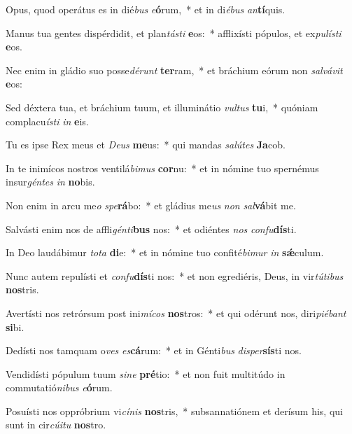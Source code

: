 \item Opus, quod operátus es in dié\textit{bus} \textit{e}\textbf{ó}rum,~* et in di\textit{é}\textit{bus} \textit{an}\textbf{tí}quis.
\item Manus tua gentes dispérdidit, et plan\textit{tás}\textit{ti} \textbf{e}os:~* afflixísti pópulos, et ex\textit{pu}\textit{lís}\textit{ti} \textbf{e}os.
\item Nec enim in gládio suo posse\textit{dé}\textit{runt} \textbf{ter}ram,~* et bráchium eórum non \textit{sal}\textit{vá}\textit{vit} \textbf{e}os:
\item Sed déxtera tua, et bráchium tuum, et illuminátio \textit{vul}\textit{tus} \textbf{tu}i,~* quóniam complacu\textit{ís}\textit{ti} \textit{in} \textbf{e}is.
\item Tu es ipse Rex meus et \textit{De}\textit{us} \textbf{me}us:~* qui mandas \textit{sa}\textit{lú}\textit{tes} \textbf{Ja}cob.
\item In te inimícos nostros ventilá\textit{bi}\textit{mus} \textbf{cor}nu:~* et in nómine tuo spernémus insur\textit{gén}\textit{tes} \textit{in} \textbf{no}bis.
\item Non enim in arcu me\textit{o} \textit{spe}\textbf{rá}bo:~* et gládius me\textit{us} \textit{non} \textit{sal}\textbf{vá}bit me.
\item Salvásti enim nos de affli\textit{gén}\textit{ti}\textbf{bus} nos:~* et odiéntes \textit{nos} \textit{con}\textit{fu}\textbf{dís}ti.
\item In Deo laudábimur \textit{to}\textit{ta} \textbf{di}e:~* et in nómine tuo confité\textit{bi}\textit{mur} \textit{in} \textbf{sǽ}culum.
\item Nunc autem repulísti et \textit{con}\textit{fu}\textbf{dís}ti nos:~* et non egrediéris, Deus, in vir\textit{tú}\textit{ti}\textit{bus} \textbf{nos}tris.
\item Avertísti nos retrórsum post ini\textit{mí}\textit{cos} \textbf{nos}tros:~* et qui odérunt nos, diri\textit{pi}\textit{é}\textit{bant} \textbf{si}bi.
\item Dedísti nos tamquam o\textit{ves} \textit{es}\textbf{cá}rum:~* et in Génti\textit{bus} \textit{di}\textit{sper}\textbf{sís}ti nos.
\item Vendidísti pópulum tuum \textit{si}\textit{ne} \textbf{pré}tio:~* et non fuit multitúdo in commutatió\textit{ni}\textit{bus} \textit{e}\textbf{ó}rum.
\item Posuísti nos oppróbrium vi\textit{cí}\textit{nis} \textbf{nos}tris,~* subsannatiónem et derísum his, qui sunt in cir\textit{cú}\textit{i}\textit{tu} \textbf{nos}tro.
